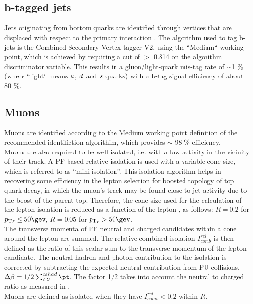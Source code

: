   

\subsection{b-tagged jets}
\label{sec:btags}
Jets originating from bottom quarks are identified through vertices that are displaced with respect to the primary interaction \cite{b-tagging}. The algorithm used to tag b-jets is the Combined Secondary Vertex tagger V2, using the ``Medium`` working point, which is achieved by requiring a cut of $>$ 0.814 on the algorithm discriminator variable. 
This results in a gluon/light-quark mis-tag rate of $\sim$1 \% (where ``light`` means $\it{u}$, $\it{d}$ and $\it{s}$ quarks) with a b-tag signal efficiency of about 80 \%. 



\subsection{Muons}
\label{sec:muon-id}
Muons are identified according to the Medium working point definition of the recommended identifiction algorithim, which provides $\sim$ 98 $\%$ efficiency. \\
Muons are also required to be well isolated, i.e. with a low activity in the vicinity of their track. 
A PF-based relative isolation is used with a variable cone size, which is referred to as ``mini-isolation''.
This isolation algorithm helps in recovering some efficiency in the lepton selection for boosted topology of top quark decay, 
in which the muon's track may be found close to jet activity due to the boost of the parent top. 
Therefore, the cone size used for the calculation of the lepton isolation is reduced as a function of 
the lepton \Pt, as follows: $R=0.2$ for $\Pt_{\ell}\leq50\gev$, $R=0.05$ for $\Pt_{\ell} > 50\gev$. \\
The transverse momenta of PF neutral and charged candidates within a cone around the lepton are summed. 
The relative combined isolation $I^{rel}_{comb}$ is then defined as 
the ratio of this scalar sum to the transverse momentum of the lepton candidate. 
The neutral hadron and photon contribution to the isolation is corrected 
by subtracting the expected neutral contribution from PU collisions, $\Delta\beta=1/2\sum_{PU}^{ch had}{\pt}$. 
The factor 1/2 takes into account the neutral to charged ratio as measured in \cite{CMS-PFT-10-002}. \\
Muons are defined as isolated when they have $I^{rel}_{comb} < 0.2$ within $R$.

